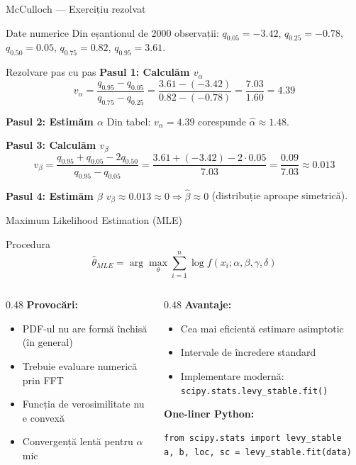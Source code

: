 \documentclass[9pt, aspectratio=169, t]{beamer}
\theoremstyle{definition}
\begin{document}
\begin{frame}{McCulloch --- Exercițiu rezolvat}
\begin{block}{Date numerice}
Din eșantionul de 2000 observații: $q_{0.05} = -3.42$, $q_{0.25} = -0.78$, $q_{0.50} = 0.05$, $q_{0.75} = 0.82$, $q_{0.95} = 3.61$.
\end{block}

\begin{exampleblock}{Rezolvare pas cu pas}
\textbf{Pasul 1: Calculăm $v_\alpha$}
$$v_\alpha = \frac{q_{0.95} - q_{0.05}}{q_{0.75} - q_{0.25}} = \frac{3.61 - (-3.42)}{0.82 - (-0.78)} = \frac{7.03}{1.60} = 4.39$$

\textbf{Pasul 2: Estimăm $\alpha$}
Din tabel: $v_\alpha = 4.39$ corespunde $\hat{\alpha} \approx 1.48$.

\textbf{Pasul 3: Calculăm $v_\beta$}
$$v_\beta = \frac{q_{0.95} + q_{0.05} - 2q_{0.50}}{q_{0.95} - q_{0.05}} = \frac{3.61 + (-3.42) - 2 \cdot 0.05}{7.03} = \frac{0.09}{7.03} \approx 0.013$$

\textbf{Pasul 4: Estimăm $\beta$}
$v_\beta \approx 0.013 \approx 0 \Rightarrow \hat{\beta} \approx 0$ (distribuție aproape simetrică).
\end{exampleblock}
\end{frame}

\begin{frame}[fragile]{Maximum Likelihood Estimation (MLE)}
\begin{block}{Procedura}
$$\hat{\theta}_{MLE} = \arg\max_{\theta} \sum_{i=1}^{n} \log f(x_i; \alpha, \beta, \gamma, \delta)$$
\end{block}

\begin{columns}[T]
\begin{column}{0.48\textwidth}
\textbf{Provocări:}
\begin{itemize}
    \item PDF-ul nu are formă închisă (în general)
    \item Trebuie evaluare numerică prin FFT
    \item Funcția de verosimilitate nu e convexă
    \item Convergență lentă pentru $\alpha$ mic
\end{itemize}
\end{column}
\begin{column}{0.48\textwidth}
\textbf{Avantaje:}
\begin{itemize}
    \item Cea mai eficientă estimare asimptotic
    \item Intervale de încredere standard
    \item Implementare modernă: \texttt{scipy.stats.levy\_stable.fit()}
\end{itemize}

\vspace{0.2cm}
\textbf{One-liner Python:}
\begin{lstlisting}
from scipy.stats import levy_stable
a, b, loc, sc = levy_stable.fit(data)
\end{lstlisting}
\end{column}
\end{columns}
\end{frame}
\end{document}
